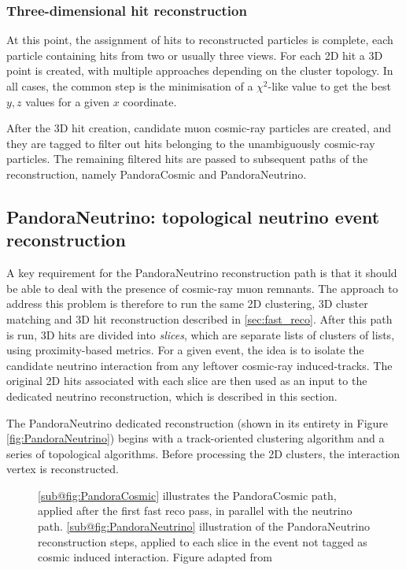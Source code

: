 \subsubsection{Three-dimensional hit reconstruction}

At this point, the assignment of hits to reconstructed particles is complete, each particle containing hits from two or usually three views. For each 2D hit a 3D point is created, with multiple approaches depending on the cluster topology. In all cases, the common step is the minimisation of a $\chi^2$-like value to get the best $y,z$ values for a given $x$ coordinate. 

After the 3D hit creation, candidate muon cosmic-ray particles are created, and they are tagged to filter out hits belonging to the unambiguously cosmic-ray particles. The remaining filtered hits are passed to subsequent paths of the reconstruction, namely PandoraCosmic and PandoraNeutrino. 

\subsection{PandoraNeutrino: topological neutrino event reconstruction} \label{sec:PandoraNeutrino}

A key requirement for the PandoraNeutrino reconstruction path is that it should be able to deal with the presence of cosmic-ray muon remnants. The approach to address this problem is therefore to run the same 2D clustering, 3D cluster matching and 3D hit reconstruction described in \autoref{sec:fast_reco}. After this path is run, 3D hits are divided into \emph{slices}, which are separate lists of clusters of lists, using proximity-based metrics. For a given event, the idea is to isolate the candidate neutrino interaction from any leftover cosmic-ray induced-tracks. The original 2D hits associated with each slice are then used as an input to the dedicated neutrino reconstruction, which is described in this section. 

The PandoraNeutrino dedicated reconstruction (shown in its entirety in Figure \ref{fig:PandoraNeutrino}) begins with a track-oriented clustering algorithm and a series of topological algorithms. Before processing the 2D clusters, the interaction vertex is reconstructed. 

\begin{figure}
    \centering
    \caption[PandoraCosmic and PandoraNeutrino paths illustration]{\ref{sub@fig:PandoraCosmic} illustrates the PandoraCosmic path, applied after the first fast reco pass, in parallel with the neutrino path. \ref{sub@fig:PandoraNeutrino} illustration of the PandoraNeutrino reconstruction steps, applied to each slice in the event not tagged as cosmic induced interaction. Figure adapted from \cite{MicroBooNE:2017xvs}}
    \label{fig:PandoraCosmicNeutrino}
\end{figure}

